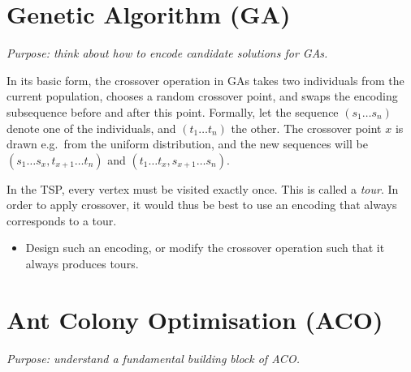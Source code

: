 \documentclass[a4paper]{article}
\begin{document}
%
%



\section*{Genetic Algorithm (GA)}

\emph{Purpose: think about how to encode candidate solutions for GAs.}

\noindent
In its basic form, the crossover operation in GAs takes two individuals from the current population, chooses a random crossover point, and swaps the encoding subsequence before and after this point.
Formally, let the sequence $(s_1 \ldots s_n)$ denote one of the individuals, and $(t_1 \ldots t_n)$ the other.
The crossover point $x$ is drawn e.g.\ from the uniform distribution, and the new sequences will be $(s_1 \ldots s_x, t_{x+1} \ldots t_n)$ and $(t_1 \ldots t_x, s_{x+1} \ldots s_n)$.

In the TSP, every vertex must be visited exactly once.
This is called a \emph{tour}.
In order to apply crossover, it would thus be best to use an encoding that always corresponds to a tour.

\begin{itemize}
\item
  Design such an encoding, or modify the crossover operation such that it always produces tours.
\end{itemize}



\section*{Ant Colony Optimisation (ACO)}

\emph{Purpose: understand a fundamental building block of ACO.}
\end{document}

